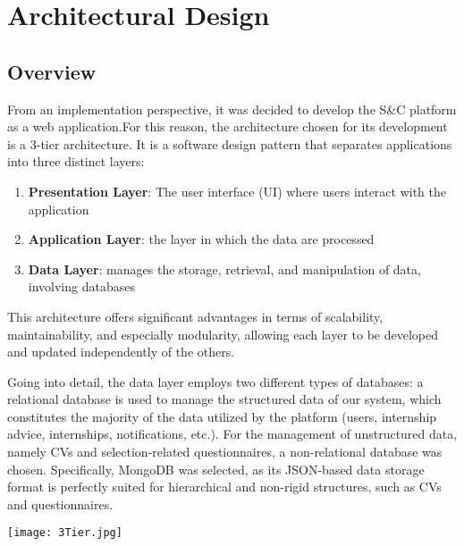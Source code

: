 \chapter{Architectural Design}
	\section{Overview}
		From an implementation perspective, it was decided to develop the S\&C platform as a web application.For this reason, the architecture chosen for its development is a 3-tier architecture. It is a software design pattern that separates applications into three distinct layers:
		\begin{enumerate}
			\item \textbf{Presentation Layer}: The user interface (UI) where users interact with the application
			\item \textbf{Application Layer}: the layer in which the data are processed
			\item \textbf{Data Layer}: manages the storage, retrieval, and manipulation of data, involving databases
		\end{enumerate}
		
		This architecture offers significant advantages in terms of scalability, maintainability, and especially modularity, allowing each layer to be developed and updated independently of the others.
		
		Going into detail, the data layer employs two different types of databases: a relational database is used to manage the structured data of our system, which constitutes the majority of the data utilized by the platform (users, internship advice, internships, notifications, etc.). For the management of unstructured data, namely CVs and selection-related questionnaires, a non-relational database was chosen. Specifically, MongoDB was selected, as its JSON-based data storage format is perfectly suited for hierarchical and non-rigid structures, such as CVs and questionnaires.
		
		\texttt{[image: 3Tier.jpg]}
		
